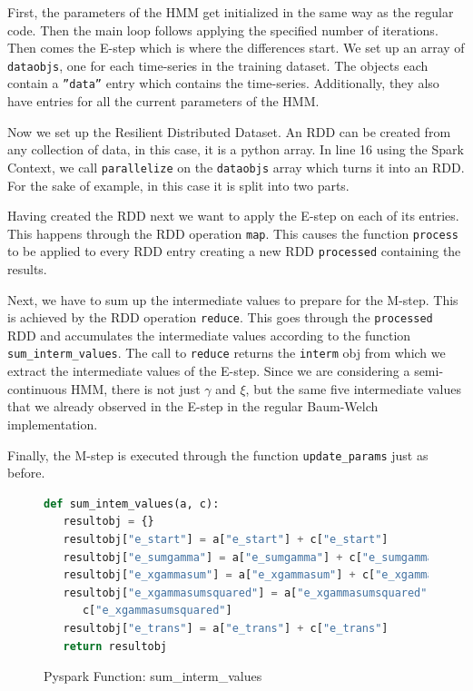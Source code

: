First, the parameters of the HMM get initialized in the same way as the regular code. Then the main loop follows applying the specified number of iterations. Then comes the E-step which is where the differences start. We set up an array of \texttt{dataobjs}, one for each time-series in the training dataset. The objects each contain a \texttt{''data''} entry which contains the time-series. Additionally, they also have entries for all the current parameters of the HMM. 

Now we set up the Resilient Distributed Dataset. An RDD can be created from any collection of data, in this case, it is a python array. In line 16 using the Spark Context, we call \texttt{parallelize} on the \texttt{dataobjs} array which turns it into an RDD. For the sake of example, in this case it is split into two parts. 

Having created the RDD next we want to apply the E-step on each of its entries. This happens through the RDD operation \texttt{map}. This causes the function \texttt{process} to be applied to every RDD entry creating a new RDD \texttt{processed} containing the results. 

Next, we have to sum up the intermediate values to prepare for the M-step. This is achieved by the RDD operation \texttt{reduce}. This goes through the \texttt{processed} RDD and accumulates the intermediate values according to the function \texttt{sum\_interm\_values}. The call to \texttt{reduce} returns the \texttt{interm} obj from which we extract the intermediate values of the E-step. Since we are considering a semi-continuous HMM, there is not just $\gamma$ and $\xi$, but the same five intermediate values that we already observed in the E-step in the regular Baum-Welch implementation. 

Finally, the M-step is executed through the function \texttt{update\_params} just as before. 

\newpage

\begin{figure}
\begin{singlespace}
\begin{lstlisting}[language=Python]
def sum_intem_values(a, c):
   resultobj = {}
   resultobj["e_start"] = a["e_start"] + c["e_start"]
   resultobj["e_sumgamma"] = a["e_sumgamma"] + c["e_sumgamma"]
   resultobj["e_xgammasum"] = a["e_xgammasum"] + c["e_xgammasum"]
   resultobj["e_xgammasumsquared"] = a["e_xgammasumsquared"] + \
      c["e_xgammasumsquared"]
   resultobj["e_trans"] = a["e_trans"] + c["e_trans"]
   return resultobj
\end{lstlisting}
\end{singlespace}
\caption{Pyspark Function: sum\_interm\_values}    
\label{fig:pyspark-sum-listing}
\end{figure}

